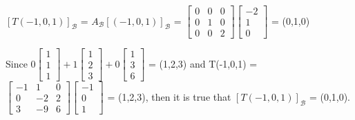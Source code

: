 \begin{tbox}
        $[T(-1,0,1)]_{\mathcal{B}}$
        = $A_{\mathcal{B}} [(-1,0,1)]_{\mathcal{B}}$ =
        $\begin{bmatrix}
            0 & 0 & 0 \\
            0 & 1 & 0 \\
            0 & 0 & 2
        \end{bmatrix}
        \begin{bmatrix}
            -2 \\
            1 \\
            0
        \end{bmatrix}$
        = (0,1,0)

        Since
        \footnotesize
        $0\begin{bmatrix}
            1 \\
            1 \\
            1
        \end{bmatrix} +
        1\begin{bmatrix}
            1 \\
            2 \\
            3
        \end{bmatrix} +
        0\begin{bmatrix}
            1 \\
            3 \\
            6
        \end{bmatrix}$
        \normalsize
        = (1,2,3)
        and T(-1,0,1) =
        \footnotesize
        $\begin{bmatrix}
            -1 & 1 & 0 \\
            0 & -2 & 2 \\
            3 & -9 & 6
        \end{bmatrix}
        \begin{bmatrix}
            -1 \\
            0 \\
            1
        \end{bmatrix}$
        \normalsize
        = (1,2,3), then it is true that
        $[T(-1,0,1)]_{\mathcal{B}}$ = (0,1,0).
    \end{tbox}












